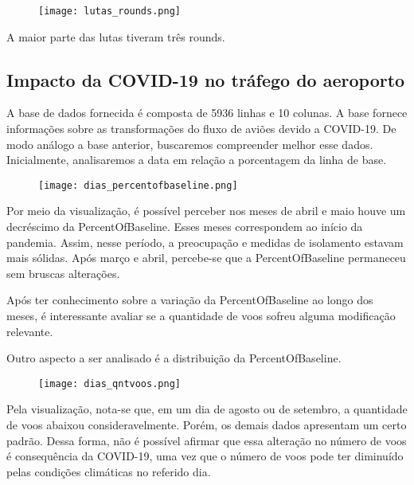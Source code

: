 \documentclass{article}
\begin{document}
\begin{figure}[H] 
    \centering 
    \texttt{[image: lutas\_rounds.png]} 
\end{figure}

\par A maior parte das lutas tiveram três rounds. 

\subsection{Impacto da COVID-19 no tráfego do aeroporto}
A base de dados fornecida é composta de 5936 linhas e 10 colunas. A base fornece informações sobre as transformações do fluxo de aviões devido a COVID-19. De modo análogo a base anterior, buscaremos compreender melhor esse dados. Inicialmente, analisaremos a data em relação a porcentagem da linha de base.

\begin{figure}[H] 
    \centering 
    \texttt{[image: dias\_percentofbaseline.png]} 
\end{figure}

Por meio da visualização, é possível perceber nos meses de abril e maio houve um decréscimo da PercentOfBaseline. Esses meses correspondem ao início da pandemia. Assim, nesse período, a preocupação e medidas de isolamento estavam mais sólidas. Após março e abril, percebe-se que a PercentOfBaseline permaneceu sem bruscas alterações. 
\par Após ter conhecimento sobre a variação da PercentOfBaseline ao longo dos meses, é interessante avaliar se a quantidade de voos sofreu alguma modificação relevante.
\par Outro aspecto a ser analisado é a distribuição da PercentOfBaseline. 

\begin{figure}[H] 
    \centering 
    \texttt{[image: dias\_qntvoos.png]} 
\end{figure}

Pela visualização, nota-se que, em um dia de agosto ou de setembro, a quantidade de voos abaixou consideravelmente. Porém, os demais dados apresentam um certo padrão. Dessa forma, não é possível afirmar que essa alteração no número de voos é consequência da COVID-19, uma vez que o número de voos pode ter diminuído pelas condições climáticas no referido dia.
\end{document}
